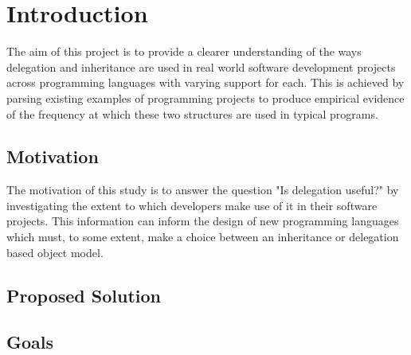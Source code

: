 \chapter{Introduction}\label{C:intro}
The aim of this project is to provide a clearer understanding of the ways delegation and inheritance are used in real world software development projects across programming languages with varying support for each. This is achieved by parsing existing examples of programming projects to produce empirical evidence of the frequency at which these two structures are used in typical programs.

\section{Motivation}
The motivation of this study is to answer the question "Is delegation useful?" by investigating the extent to which developers make use of it in their software projects. This information can inform the design of new programming languages which must, to some extent, make a choice between an inheritance or delegation based object model.

\section{Proposed Solution}

\section{Goals}
